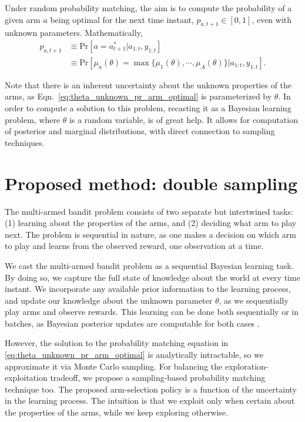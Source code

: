 \documentclass{article}
\begin{document}
Under random probability matching, the aim is to compute the probability of a given arm $a$ being optimal for the next time instant, $p_{a,t+1}\in [0,1]$, even with unknown parameters. Mathematically,
\begin{equation}
\begin{split}
p_{a,t+1} &\equiv \mathrm{Pr}\left[a=a_{t+1}^* \big| a_{1:t}, y_{1:t}\right] \\
	&\equiv \mathrm{Pr}\left[ \mu_{a}(\theta) = \max\{\mu_1(\theta), \cdots, \mu_A(\theta)\} \big| a_{1:t}, y_{1:t}\right].
\end{split}
\label{eq:theta_unknown_pr_arm_optimal}
\end{equation}

Note that there is an inherent uncertainty about the unknown properties of the arms, as Eqn.~\eqref{eq:theta_unknown_pr_arm_optimal} is parameterized by $\theta$. In order to compute a solution to this problem, recasting it as a Bayesian learning problem, where $\theta$ is a random variable, is of great help. It allows for computation of posterior and marginal distributions, with direct connection to sampling techniques.

\section{Proposed method: double sampling}
\label{sec:proposed_method}

The multi-armed bandit problem consists of two separate but intertwined tasks: (1) learning about the properties of the arms, and (2) deciding what arm to play next. The problem is sequential in nature, as one makes a decision on which arm to play and learns from the observed reward, one observation at a time.

We cast the multi-armed bandit problem as a sequential Bayesian learning task. By doing so, we capture the full state of knowledge about the world at every time instant. We incorporate any available prior information to the learning process, and update our knowledge about the unknown parameter $\theta$, as we sequentially play arms and observe rewards. This learning can be done both sequentially or in batches, as Bayesian posterior updates are computable for both cases \cite{b-Bernardo2009}.

However, the solution to the probability matching equation in \eqref{eq:theta_unknown_pr_arm_optimal} is analytically intractable, so we approximate it via Monte Carlo sampling. For balancing the exploration-exploitation tradeoff, we propose a sampling-based probability matching technique too. The proposed arm-selection policy is a function of the uncertainty in the learning process. The intuition is that we exploit only when certain about the properties of the arms, while we keep exploring otherwise.
\end{document}

